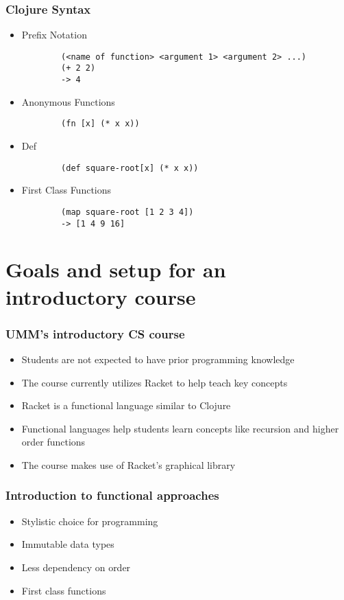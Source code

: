 \documentclass{beamer}
\begin{document}
\begin{frame}[fragile]
\frametitle{Clojure Syntax}
\begin{itemize}
	\item Prefix Notation			
	\begin{verbatim}
		(<name of function> <argument 1> <argument 2> ...)
		(+ 2 2)
		-> 4
	\end{verbatim}
	\item Anonymous Functions
	\begin{verbatim}
		(fn [x] (* x x))
	\end{verbatim}
	\item Def
	\begin{verbatim}
		(def square-root[x] (* x x))
	\end{verbatim}
	\item First Class Functions
	\begin{verbatim}
		(map square-root [1 2 3 4])
		-> [1 4 9 16]
	\end{verbatim}
\end{itemize}
\end{frame}

\section{Goals and setup for an introductory course}

\begin{frame}
\frametitle{UMM's introductory CS course}
\begin{itemize}
\item Students are not expected to have prior programming knowledge
\item The course currently utilizes Racket to help teach key concepts
\item Racket is a functional language similar to Clojure
\item Functional languages help students learn concepts like recursion and higher order functions
\item The course makes use of Racket's graphical library 
\end{itemize}
\end{frame}

\begin{frame}
\frametitle{Introduction to functional approaches}
\begin{itemize}
\item Stylistic choice for programming
\item Immutable data types
\item Less dependency on order
\item First class functions
\end{itemize}
\end{frame}
\end{document}

